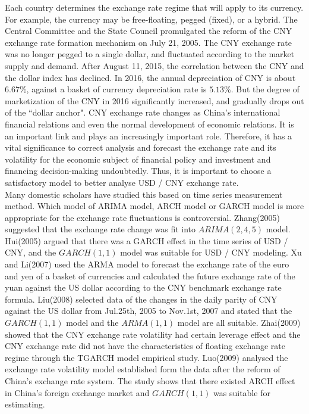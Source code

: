 \documentclass[12pt, a4paper, titlepage]{article}
\begin{document}
Each country determines the exchange rate regime that will apply to its currency. For example, the currency may be free-floating, pegged (fixed), or a hybrid. The Central Committee and the State Council promulgated the reform of the CNY exchange rate formation mechanism on July 21, 2005. The CNY exchange rate was no longer pegged to a single dollar, and fluctuated according to the market supply and demand. After August 11, 2015, the correlation between the CNY and the dollar index has declined. In 2016, the annual depreciation of CNY is about $6.67\%$, against a basket of currency depreciation rate is $5.13\%$. But the degree of marketization of the CNY in 2016 significantly increased, and gradually drops out of the ``dollar anchor". CNY exchange rate changes as China's international financial relations and even the normal development of economic relations. It is an important link and plays an increasingly important role. Therefore, it has a vital significance to correct analysis and forecast the exchange rate and its volatility for the economic subject of financial policy and investment and financing decision-making undoubtedly. Thus, it is important to choose a satisfactory model to better analyse USD / CNY exchange rate.\\

Many domestic scholars have studied this based on time series measurement method. Which model of ARIMA model, ARCH model or GARCH model is more appropriate for the exchange rate fluctuations is controversial. Zhang(2005) suggested that the exchange rate change was fit into $ARIMA(2,4,5)$ model. Hui(2005) argued that there was a GARCH effect in the time series of USD / CNY, and the $GARCH(1,1)$ model was suitable for USD / CNY modeling. Xu and Li(2007) used the ARMA model to forecast the exchange rate of the euro and yen of a basket of currencies and calculated the future exchange rate of the yuan against the US dollar according to the CNY benchmark exchange rate formula. Liu(2008) selected data of the changes in the daily parity of CNY against the US dollar from Jul.25th, 2005 to Nov.1st, 2007 and stated that the $GARCH(1,1)$ model and the $ARMA(1,1)$ model are all suitable. Zhai(2009) showed that the CNY exchange rate volatility had certain leverage effect and the CNY exchange rate did not have the characteristics of floating exchange rate regime through the TGARCH model empirical study. Luo(2009) analysed the exchange rate volatility model established form the data after the reform of China's exchange rate system. The study shows that there existed ARCH effect in China's foreign exchange market and $GARCH(1,1)$ was suitable for estimating.\\
\end{document}
